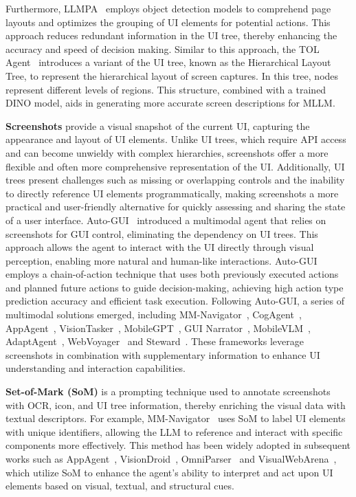 Furthermore, LLMPA~\cite{guan2023intelligent} employs object detection models to comprehend page layouts and optimizes the grouping of UI elements for potential actions. This approach reduces redundant information in the UI tree, thereby enhancing the accuracy and speed of decision making. Similar to this approach, the TOL Agent~\cite{fan2024readpointedlayoutawaregui} introduces a variant of the UI tree, known as the Hierarchical Layout Tree, to represent the hierarchical layout of screen captures. In this tree, nodes represent different levels of regions. This structure, combined with a trained DINO model, aids in generating more accurate screen descriptions for MLLM.


\noindent\textbf{Screenshots}
provide a visual snapshot of the current UI, capturing the appearance and layout of UI elements. Unlike UI trees, which require API access and can become unwieldy with complex hierarchies, screenshots offer a more flexible and often more comprehensive representation of the UI. Additionally, UI trees present challenges such as missing or overlapping controls and the inability to directly reference UI elements programmatically, making screenshots a more practical and user-friendly alternative for quickly assessing and sharing the state of a user interface.
Auto-GUI~\cite{zhang2023youautoui} introduced a multimodal agent that relies on screenshots for GUI control, eliminating the dependency on UI trees. This approach allows the agent to interact with the UI directly through visual perception, enabling more natural and human-like interactions. Auto-GUI employs a chain-of-action technique that uses both previously executed actions and planned future actions to guide decision-making, achieving high action type prediction accuracy and efficient task execution.
Following Auto-GUI, a series of multimodal solutions emerged, including MM-Navigator~\cite{yan2023gpt}, CogAgent~\cite{hong2024cogagent}, AppAgent~\cite{zhang2023appagent}, VisionTasker~\cite{song2024visiontasker}, MobileGPT~\cite{lee2023exploremobilegpt}, GUI Narrator~\cite{wu2024gui}, MobileVLM~\cite{wu2024mobilevlm}, AdaptAgent~\cite{verma2024adaptagent}, WebVoyager~\cite{he2024webvoyager} and Steward~\cite{tang2024steward}. These frameworks leverage screenshots in combination with supplementary information to enhance UI understanding and interaction capabilities.



\noindent\textbf{Set-of-Mark (SoM)}
is a prompting technique used to annotate screenshots with OCR, icon, and UI tree information, thereby enriching the visual data with textual descriptors\cite{yang2023setofmark}. For example, MM-Navigator~\cite{yan2023gpt} uses SoM to label UI elements with unique identifiers, allowing the LLM to reference and interact with specific components more effectively. This method has been widely adopted in subsequent works such as AppAgent~\cite{zhang2023appagent}, VisionDroid~\cite{liu2024vision}, OmniParser~\cite{lu2024omniparser} and VisualWebArena~\cite{koh2024visualwebarena}, which utilize SoM to enhance the agent's ability to interpret and act upon UI elements based on visual, textual, and structural cues.


